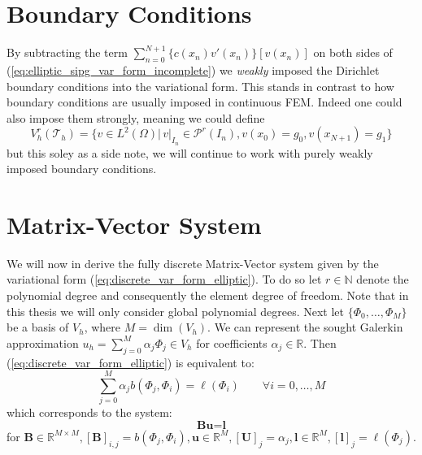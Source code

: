 \section{Boundary Conditions}
By subtracting the term $\sum_{n=0}^{N+1} \{c(x_n)v'(x_n)\}[v(x_n)]$ on both sides
of (\ref{eq:elliptic_sipg_var_form_incomplete}) we \textit{weakly} imposed the Dirichlet
boundary conditions into the variational form. This stands in contrast to how boundary 
conditions are usually imposed in continuous FEM. Indeed one could also impose them strongly,
meaning we could define 
\begin{equation*}
    V_h^r(\mathcal{T}_h) = \{v \in L^2(\Omega) |\, v|_{I_n} \in \mathcal{P}^r(I_n), v(x_0)=g_0, v(x_{N+1})=g_1 \}
\end{equation*}
but this soley as a side note, we will continue to work with purely weakly imposed 
boundary conditions.  

\section{Matrix-Vector System}
We will now in derive the fully discrete Matrix-Vector system given by
the variational form (\ref{eq:discrete_var_form_elliptic}). To do so let
$r \in \mathbb{N}$ denote the polynomial degree and consequently the element degree of freedom. Note that in this thesis we will only consider global polynomial degrees.
Next let $\{\Phi_0,\ldots,\Phi_M\}$ be a basis of $V_h$, where $M = \dim(V_h)$.
We can represent the sought Galerkin approximation $u_h = \sum_{j=0}^{M} \alpha_j \Phi_j\in V_h$ for coefficients 
$\alpha_j \in \mathbb{R}$. Then (\ref{eq:discrete_var_form_elliptic}) is equivalent to:
\begin{equation*}
    \sum_{j=0}^{M} \alpha_j b(\Phi_j, \Phi_i) = \ell(\Phi_i) \qquad \forall i=0,\ldots,M
\end{equation*}
which corresponds to the system:
\begin{equation}
    \label{eq:fully_discrete_dg_system_elliptic}
    \textbf{Bu} = \textbf{l}
\end{equation}
for $ \textbf{B} \in \mathbb{R}^{M\times M}, [\textbf{B}]_{i,j} = b(\Phi_j, \Phi_i), 
\textbf{u} \in \mathbb{R}^M, [\textbf{U}]_j = \alpha_j, 
\textbf{l}\in\mathbb{R}^M, [\textbf{l}]_j = \ell(\Phi_j)$.

